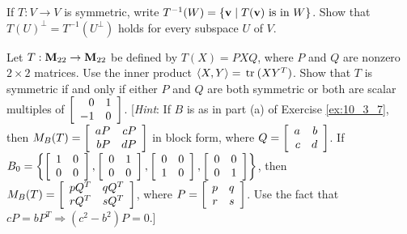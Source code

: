\begin{multicols}{2}
\begin{ex}
If $T : V \to V$ is symmetric, write $T^{-1}(W) = \{\textbf{v} \mid T(\textbf{v}) \mbox{ is in } W\}$. Show that \newline $T(U)^{\perp} = T^{-1}(U^{\perp})$ holds for every subspace $U$ of $V$.
\end{ex}

\begin{ex}
Let $T : \textbf{M}_{22} \to \textbf{M}_{22}$ be defined by $T(X) = PXQ$, where $P$ and $Q$ are nonzero $2 \times 2$ matrices. Use the inner product $\langle X, Y\rangle = \thinspace\operatorname{tr\medspace}(XY^{T})$. Show that $T$ is symmetric if and only if either $P$ and $Q$ are both symmetric or both are scalar multiples of 
$\left[ \begin{array}{rr}
0 & 1 \\
-1 & 0
\end{array} \right]$. [\textit{Hint}: If $B$ is as in part (a) of Exercise \ref{ex:10_3_7}, then 
\newline $M_B(T) = 
\left[ \begin{array}{rr}
aP & cP \\
bP & dP
\end{array} \right]$ in block form, where \newline $Q = 
\left[ \begin{array}{rr}
a & b \\
c & d
\end{array} \right]$. \newline If $B_0 = 
\left\{
\left[ \begin{array}{rr}
1 & 0 \\
0 & 0
\end{array} \right]
,
\left[ \begin{array}{rr}
0 & 1 \\
0 & 0
\end{array} \right]
, 
\left[ \begin{array}{rr}
0 & 0 \\
1 & 0
\end{array} \right]
,
\left[ \begin{array}{rr}
0 & 0 \\
0 & 1
\end{array} \right]
\right\}$, then $M_B(T) = 
\left[ \begin{array}{cc}
pQ^T & qQ^T \\
rQ^T & sQ^T
\end{array} \right]$, where $P = 
\left[ \begin{array}{rr}
p & q \\
r & s
\end{array} \right]$. Use the fact that $cP = bP^T \Rightarrow (c^2 - b^2)P = 0.$]
\end{ex}


\end{multicols}
